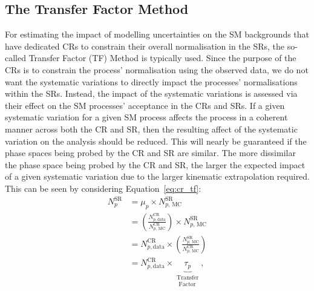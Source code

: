 %
%
\subsection{The Transfer Factor Method}
\label{sec:transfer_factor}

For estimating the impact of modelling uncertainties on the SM backgrounds that
have dedicated CRs to constrain their overall normalisation in the SRs,
the so-called Transfer Factor (TF) Method is typically used.
Since the purpose of the CRs is to constrain the process' normalisation using
the observed data, we do not want the systematic variations to directly
impact the processes' normalisations within the SRs.
Instead, the impact of the systematic variations is assessed via their effect
on the SM processes' acceptance in the CRs and SRs.
If a given systematic variation for a given SM process affects the process
in a coherent manner across both the CR and SR, then the resulting affect of the systematic variation
on the analysis should be reduced.
This will nearly be guaranteed if the phase spaces being probed by the CR and SR
are similar.
The more dissimilar the phase space being probed by the CR and SR, the larger
the expected impact of a given systematic variation due to the larger kinematic
extrapolation required.
This can be seen by considering Equation~\ref{eq:cr_tf}:
\begin{align}
    N_{p}^{\text{SR}} &= \mu_p \times N_{p,\,\text{MC}}^{\text{SR}} \nonumber \\
        &= \left( \frac{N_{p, \text{data}}^{\text{CR}}}{N_{p,\,\text{MC}}^{\text{CR}}} \right) \times N_{p,\,\text{MC}}^{\text{SR}} \nonumber \\
        &= N_{p, \text{data}}^{\text{CR}} \times \left( \frac{ N_{p,\,\text{MC}}^{\text{SR}}  }{ N_{p,\,\text{MC}}^{\text{CR}} } \right) \label{eq:cr_tf} \\
        &= N_{p, \text{data}}^{\text{CR}} \times \underbrace{\tau_p}_{\substack{\text{Transfer} \\ \text{ Factor}}} \nonumber,
\end{align}
